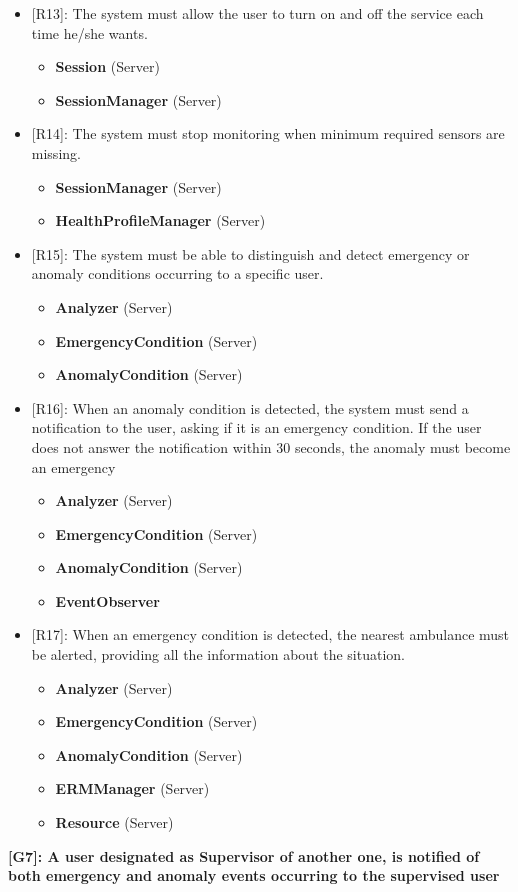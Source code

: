 \begin{itemize}
	\item {[R13]: The system must allow the user to turn on and off the service each time he/she wants.}
	\begin{itemize}
		\item {\textbf{Session} (Server)}
		\item {\textbf{SessionManager} (Server)}
	\end{itemize}   
	\item {[R14]: The system must stop monitoring when minimum required sensors are missing.}
	\begin{itemize}
		\item {\textbf{SessionManager} (Server)}
		\item {\textbf{HealthProfileManager} (Server)}
	\end{itemize}   
	\item {[R15]: The system must be able to distinguish and detect emergency or anomaly conditions occurring to a specific user.}
	\begin{itemize}
		\item {\textbf{Analyzer} (Server)}
		\item {\textbf{EmergencyCondition} (Server)}
		\item {\textbf{AnomalyCondition} (Server)}
	\end{itemize}   
	\item {[R16]: When an anomaly condition is detected, the system must send a notification to the user, asking if it is an emergency condition. If the user does not answer the notification within 30 seconds, the anomaly must become an emergency }
	\begin{itemize}
		\item {\textbf{Analyzer} (Server)}
		\item {\textbf{EmergencyCondition} (Server)}
		\item {\textbf{AnomalyCondition} (Server)}
		\item {\textbf{EventObserver}}
	\end{itemize}   
	\item {[R17]: When an emergency condition is detected, the nearest ambulance must be alerted, providing all the information about the situation.}
	\begin{itemize}
		\item {\textbf{Analyzer} (Server)}
		\item {\textbf{EmergencyCondition} (Server)}
		\item {\textbf{AnomalyCondition} (Server)}
		\item {\textbf{ERMManager} (Server)}
		\item {\textbf{Resource} (Server)}
	\end{itemize}   
\end{itemize}
\raggedbottom
\textbf{[G7]: A user designated as Supervisor of another one, is notified of both emergency and anomaly events occurring to the supervised user}

